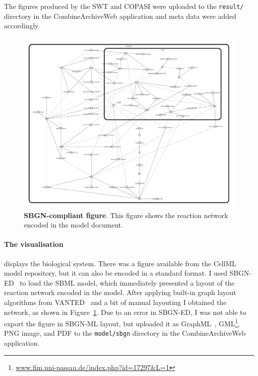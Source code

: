 The figures produced by the SWT and COPASI were uploaded to the \texttt{result/} directory in the CombineArchiveWeb application and meta data were added accordingly.



\begin{figure}
\begin{center}
\includegraphics[width=.7\textwidth]{img/Calzone2007.png}
\end{center}
\caption{\textbf{SBGN-compliant figure}. This figure shows the reaction network encoded in the model document.}
\label{fig:sbgngraph}
\end{figure}
\paragraph{The visualisation} displays the biological system.
There was a figure available from the CellML model repository, but it can also be encoded in a standard format.
I used SBGN-ED~\cite{sbgned} to load the SBML model, which immediately presented a layout of the reaction network encoded in the model.
After applying built-in graph layout algorithms from VANTED~\cite{vanted} and a bit of manual layouting I obtained the network, as shown in Figure~\ref{fig:sbgngraph}.
Due to an error in SBGN-ED, I was not able to export the figure in SBGN-ML layout, but uploaded it as GraphML~\cite{graphml}, GML\footnote{\href{http://www.fim.uni-passau.de/index.php?id=17297&L=1}{www.fim.uni-passau.de/index.php?id=17297\&L=1}}, PNG image, and PDF to the \texttt{model/sbgn} directory in the CombineArchiveWeb application.


























